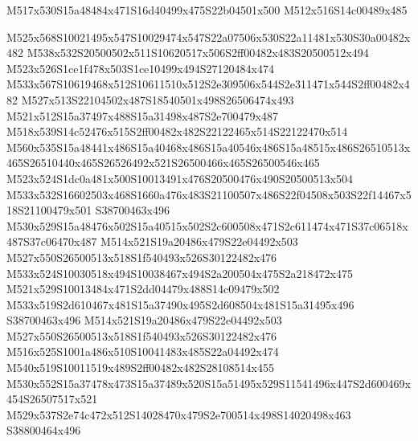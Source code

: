 \documentclass{article}
\begin{document}
\begin{multicols}{2}






\begin{center}
M517x530S15a48484x471S16d40499x475S22b04501x500 M512x516S14c00489x485 
\end{center}




M525x568S10021495x547S10029474x547S22a07506x530S22a11481x530S30a00482x482 M538x532S20500502x511S10620517x506S2ff00482x483S20500512x494 M523x526S1ce1f478x503S1ce10499x494S27120484x474 M533x567S10619468x512S10611510x512S2e309506x544S2e311471x544S2ff00482x482 M527x513S22104502x487S18540501x498S26506474x493 M521x512S15a37497x488S15a31498x487S2e700479x487 M518x539S14c52476x515S2ff00482x482S22122465x514S22122470x514 M560x535S15a48441x486S15a40468x486S15a40546x486S15a48515x486S26510513x465S26510440x465S26526492x521S26500466x465S26500546x465 M523x524S1dc0a481x500S10013491x476S20500476x490S20500513x504 M533x532S16602503x468S1660a476x483S21100507x486S22f04508x503S22f14467x518S21100479x501 S38700463x496 M530x529S15a48476x502S15a40515x502S2c600508x471S2c611474x471S37c06518x487S37c06470x487 M514x521S19a20486x479S22e04492x503 M527x550S26500513x518S1f540493x526S30122482x476 M533x524S10030518x494S10038467x494S2a200504x475S2a218472x475 M521x529S10013484x471S2dd04479x488S14c09479x502 M533x519S2d610467x481S15a37490x495S2d608504x481S15a31495x496 S38700463x496 M514x521S19a20486x479S22e04492x503 M527x550S26500513x518S1f540493x526S30122482x476 M516x525S1001a486x510S10041483x485S22a04492x474 M540x519S10011519x489S2ff00482x482S28108514x455 M530x552S15a37478x473S15a37489x520S15a51495x529S11541496x447S2d600469x454S26507517x521 M529x537S2e74c472x512S14028470x479S2e700514x498S14020498x463 S38800464x496


\end{multicols}
\end{document}
